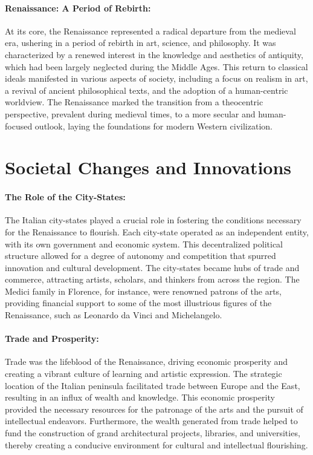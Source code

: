 \documentclass[a4paper,12pt]{book}
\begin{document}
\paragraph{Renaissance: A Period of Rebirth:}
At its core, the Renaissance represented a radical departure from the medieval era, ushering in a period of rebirth in art, science, and philosophy. It was characterized by a renewed interest in the knowledge and aesthetics of antiquity, which had been largely neglected during the Middle Ages. This return to classical ideals manifested in various aspects of society, including a focus on realism in art, a revival of ancient philosophical texts, and the adoption of a human-centric worldview. The Renaissance marked the transition from a theocentric perspective, prevalent during medieval times, to a more secular and human-focused outlook, laying the foundations for modern Western civilization.

\section*{Societal Changes and Innovations}

\paragraph{The Role of the City-States:}
The Italian city-states played a crucial role in fostering the conditions necessary for the Renaissance to flourish. Each city-state operated as an independent entity, with its own government and economic system. This decentralized political structure allowed for a degree of autonomy and competition that spurred innovation and cultural development. The city-states became hubs of trade and commerce, attracting artists, scholars, and thinkers from across the region. The Medici family in Florence, for instance, were renowned patrons of the arts, providing financial support to some of the most illustrious figures of the Renaissance, such as Leonardo da Vinci and Michelangelo.

\paragraph{Trade and Prosperity:}
Trade was the lifeblood of the Renaissance, driving economic prosperity and creating a vibrant culture of learning and artistic expression. The strategic location of the Italian peninsula facilitated trade between Europe and the East, resulting in an influx of wealth and knowledge. This economic prosperity provided the necessary resources for the patronage of the arts and the pursuit of intellectual endeavors. Furthermore, the wealth generated from trade helped to fund the construction of grand architectural projects, libraries, and universities, thereby creating a conducive environment for cultural and intellectual flourishing.
\end{document}
